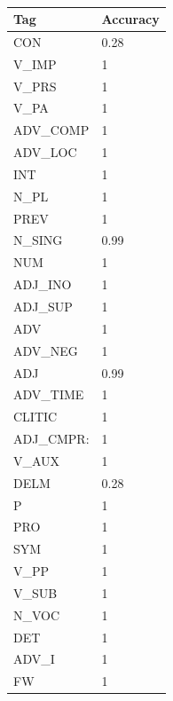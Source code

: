 \documentclass[12pt, a4paper]{article}
\begin{document}
\begin{latin}
\begin{table}[h]
    \centering
    \caption{ }
    \label{tag_accuracy}
    \begin{tabular}{l|l}
        Tag & Accuracy \\ \hline
        CON & 0.28 \\ \hline
        V\_IMP & 1 \\ \hline
        V\_PRS & 1 \\ \hline
        V\_PA & 1 \\ \hline
        ADV\_COMP & 1 \\ \hline
        ADV\_LOC & 1 \\ \hline
        INT & 1 \\ \hline
        N\_PL & 1 \\ \hline
        PREV & 1 \\ \hline
        N\_SING & 0.99 \\ \hline
        NUM & 1 \\ \hline
        ADJ\_INO & 1 \\ \hline
        ADJ\_SUP & 1 \\ \hline
        ADV & 1 \\ \hline
        ADV\_NEG & 1 \\ \hline
        ADJ & 0.99 \\ \hline
        ADV\_TIME & 1 \\ \hline
        CLITIC & 1 \\ \hline
        ADJ\_CMPR: & 1 \\ \hline
        V\_AUX & 1 \\ \hline
        DELM & 0.28 \\ \hline
        P & 1 \\ \hline
        PRO & 1 \\ \hline
        SYM & 1 \\ \hline
        V\_PP & 1 \\ \hline
        V\_SUB & 1 \\ \hline
        N\_VOC & 1 \\ \hline
        DET & 1 \\ \hline
        ADV\_I & 1 \\ \hline
        FW & 1 \\
    \end{tabular}
\end{table}
\end{latin}
\end{document}
